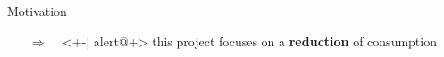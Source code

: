 \documentclass[11pt,aspectratio=169]{beamer}
\newcommand{\ar}{$\Rightarrow$ \ }
\begin{document}
\begin{frame}{Motivation}
\begin{itemize}[<+-| alert@+>]
		\vspace{4mm}
		\item[\ar]<+-| alert@+>  this project focuses on a \textbf{\textcolor{cyan!100}{reduction}}  of consumption %
	\end{itemize}
\end{frame}
\end{document}
